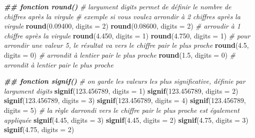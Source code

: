 \documentclass[
]{book}
\newenvironment{Shaded}{\begin{snugshade}}{\end{snugshade}}
\newcommand{\AttributeTok}[1]{\textcolor[rgb]{0.13,0.29,0.53}{#1}}
\newcommand{\CommentTok}[1]{\textcolor[rgb]{0.56,0.35,0.01}{\textit{#1}}}
\newcommand{\DecValTok}[1]{\textcolor[rgb]{0.00,0.00,0.81}{#1}}
\newcommand{\DocumentationTok}[1]{\textcolor[rgb]{0.56,0.35,0.01}{\textbf{\textit{#1}}}}
\newcommand{\FloatTok}[1]{\textcolor[rgb]{0.00,0.00,0.81}{#1}}
\newcommand{\FunctionTok}[1]{\textcolor[rgb]{0.13,0.29,0.53}{\textbf{#1}}}
\newcommand{\NormalTok}[1]{#1}
\begin{document}
\begin{Shaded}
\begin{Highlighting}[]
\DocumentationTok{\#\# fonction round()}
\CommentTok{\# l\textquotesingle{}argument digits permet de définir le nombre de chiffres après la virgule}
\CommentTok{\# exemple si vous voulez arrondir à 2 chiffres après la virgule}
\FunctionTok{round}\NormalTok{(}\FloatTok{0.09400}\NormalTok{, }\AttributeTok{digits =} \DecValTok{2}\NormalTok{)}
\FunctionTok{round}\NormalTok{(}\FloatTok{0.08600}\NormalTok{, }\AttributeTok{digits =} \DecValTok{2}\NormalTok{)}
\CommentTok{\# arroudir à 1 chiffre après la virgule}
\FunctionTok{round}\NormalTok{(}\FloatTok{4.450}\NormalTok{, }\AttributeTok{digits =} \DecValTok{1}\NormalTok{)}
\FunctionTok{round}\NormalTok{(}\FloatTok{4.750}\NormalTok{, }\AttributeTok{digits =} \DecValTok{1}\NormalTok{)}
\CommentTok{\# pour arrondir une valeur 5, le résultat va vers le chiffre pair le plus proche}
\FunctionTok{round}\NormalTok{(}\FloatTok{4.5}\NormalTok{, }\AttributeTok{digits =} \DecValTok{0}\NormalTok{) }\CommentTok{\# arrondit à l\textquotesingle{}entier pair le plus proche}
\FunctionTok{round}\NormalTok{(}\FloatTok{1.5}\NormalTok{, }\AttributeTok{digits =} \DecValTok{0}\NormalTok{) }\CommentTok{\# arrondit à l\textquotesingle{}entier pair le plus proche}

\DocumentationTok{\#\# fonction signif()}
\CommentTok{\# on garde les valeurs les plus significative, définie par l\textquotesingle{}argument digits}
\FunctionTok{signif}\NormalTok{(}\FloatTok{123.456789}\NormalTok{, }\AttributeTok{digits =} \DecValTok{1}\NormalTok{)}
\FunctionTok{signif}\NormalTok{(}\FloatTok{123.456789}\NormalTok{, }\AttributeTok{digits =} \DecValTok{2}\NormalTok{)}
\FunctionTok{signif}\NormalTok{(}\FloatTok{123.456789}\NormalTok{, }\AttributeTok{digits =} \DecValTok{3}\NormalTok{)}
\FunctionTok{signif}\NormalTok{(}\FloatTok{123.456789}\NormalTok{, }\AttributeTok{digits =} \DecValTok{4}\NormalTok{)}
\FunctionTok{signif}\NormalTok{(}\FloatTok{123.456789}\NormalTok{, }\AttributeTok{digits =} \DecValTok{5}\NormalTok{)}
\CommentTok{\# la règle d\textquotesingle{}arrondi vers le chiffre pair le plus proche est également appliquée}
\FunctionTok{signif}\NormalTok{(}\FloatTok{4.45}\NormalTok{, }\AttributeTok{digits =} \DecValTok{3}\NormalTok{)}
\FunctionTok{signif}\NormalTok{(}\FloatTok{4.45}\NormalTok{, }\AttributeTok{digits =} \DecValTok{2}\NormalTok{)}
\FunctionTok{signif}\NormalTok{(}\FloatTok{4.75}\NormalTok{, }\AttributeTok{digits =} \DecValTok{3}\NormalTok{)}
\FunctionTok{signif}\NormalTok{(}\FloatTok{4.75}\NormalTok{, }\AttributeTok{digits =} \DecValTok{2}\NormalTok{)}


\end{Highlighting}
\end{Shaded}
\end{document}
